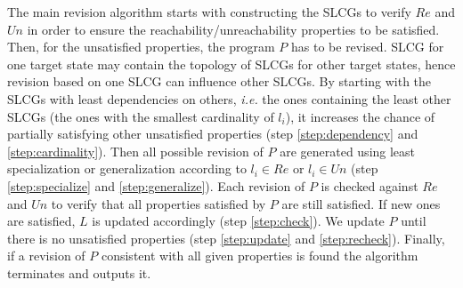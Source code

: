     The main revision algorithm starts with constructing the SLCGs to verify $Re$ and $Un$ in order to ensure the reachability/unreachability properties to be satisfied.
    Then, for the unsatisfied properties, the program $P$ has to be revised.
    SLCG for one target state may contain the topology of SLCGs for other target states, hence revision based on one SLCG can influence other SLCGs.
    By starting with the SLCGs with least dependencies on others, \textit{i.e.} the ones containing the least other SLCGs (the ones with the smallest cardinality of $l_i$), it increases the chance of partially satisfying other unsatisfied properties (step \ref{step:dependency} and \ref{step:cardinality}). 
    Then all possible revision of $P$ are generated using least specialization or generalization according to $l_i\in Re$ or $l_i \in Un$ (step \ref{step:specialize} and \ref{step:generalize}). 
    Each revision of $P$ is checked against $Re$ and $Un$ to verify that all properties satisfied by $P$ are still satisfied. 
    If new ones are satisfied, $L$ is updated accordingly (step \ref{step:check}).
    We update $P$ until there is no unsatisfied properties (step \ref{step:update} and \ref{step:recheck}).
    Finally, if a revision of $P$ consistent with all given properties is found the algorithm terminates and outputs it.
    
